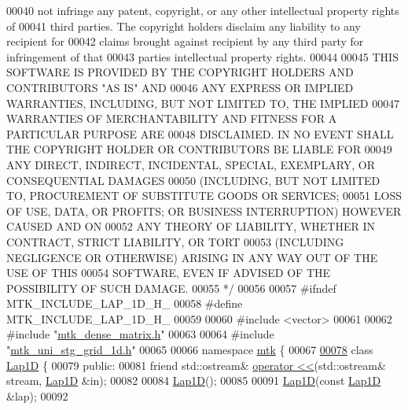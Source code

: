 \begin{DoxyCode}
00040 \textcolor{comment}{not infringe any patent, copyright, or any other intellectual property rights of}
00041 \textcolor{comment}{third parties. The copyright holders disclaim any liability to any recipient for}
00042 \textcolor{comment}{claims brought against recipient by any third party for infringement of that}
00043 \textcolor{comment}{parties intellectual property rights.}
00044 \textcolor{comment}{}
00045 \textcolor{comment}{THIS SOFTWARE IS PROVIDED BY THE COPYRIGHT HOLDERS AND CONTRIBUTORS "AS IS" AND}
00046 \textcolor{comment}{ANY EXPRESS OR IMPLIED WARRANTIES, INCLUDING, BUT NOT LIMITED TO, THE IMPLIED}
00047 \textcolor{comment}{WARRANTIES OF MERCHANTABILITY AND FITNESS FOR A PARTICULAR PURPOSE ARE}
00048 \textcolor{comment}{DISCLAIMED. IN NO EVENT SHALL THE COPYRIGHT HOLDER OR CONTRIBUTORS BE LIABLE FOR}
00049 \textcolor{comment}{ANY DIRECT, INDIRECT, INCIDENTAL, SPECIAL, EXEMPLARY, OR CONSEQUENTIAL DAMAGES}
00050 \textcolor{comment}{(INCLUDING, BUT NOT LIMITED TO, PROCUREMENT OF SUBSTITUTE GOODS OR SERVICES;}
00051 \textcolor{comment}{LOSS OF USE, DATA, OR PROFITS; OR BUSINESS INTERRUPTION) HOWEVER CAUSED AND ON}
00052 \textcolor{comment}{ANY THEORY OF LIABILITY, WHETHER IN CONTRACT, STRICT LIABILITY, OR TORT}
00053 \textcolor{comment}{(INCLUDING NEGLIGENCE OR OTHERWISE) ARISING IN ANY WAY OUT OF THE USE OF THIS}
00054 \textcolor{comment}{SOFTWARE, EVEN IF ADVISED OF THE POSSIBILITY OF SUCH DAMAGE.}
00055 \textcolor{comment}{*/}
00056 
00057 \textcolor{preprocessor}{#ifndef MTK\_INCLUDE\_LAP\_1D\_H\_}
00058 \textcolor{preprocessor}{#define MTK\_INCLUDE\_LAP\_1D\_H\_}
00059 
00060 \textcolor{preprocessor}{#include <vector>}
00061 
00062 \textcolor{preprocessor}{#include "\hyperlink{mtk__dense__matrix_8h}{mtk\_dense\_matrix.h}"}
00063 
00064 \textcolor{preprocessor}{#include "\hyperlink{mtk__uni__stg__grid__1d_8h}{mtk\_uni\_stg\_grid\_1d.h}"}
00065 
00066 \textcolor{keyword}{namespace }\hyperlink{namespacemtk}{mtk} \{
00067 
\hypertarget{mtk__lap__1d_8h_source_l00078}{}\hyperlink{classmtk_1_1Lap1D}{00078} \textcolor{keyword}{class }\hyperlink{classmtk_1_1Lap1D}{Lap1D} \{
00079  \textcolor{keyword}{public}:
00081   \textcolor{keyword}{friend} std::ostream& \hyperlink{classmtk_1_1Lap1D_a235390479381d4e95163674968a1ca7c}{operator <<}(std::ostream& stream, \hyperlink{classmtk_1_1Lap1D}{Lap1D} &in);
00082 
00084   \hyperlink{classmtk_1_1Lap1D_a6fc2aeea35d4dfa49f17e625411f5a70}{Lap1D}();
00085 
00091   \hyperlink{classmtk_1_1Lap1D_a6fc2aeea35d4dfa49f17e625411f5a70}{Lap1D}(\textcolor{keyword}{const} \hyperlink{classmtk_1_1Lap1D}{Lap1D} &lap);
00092 

\end{DoxyCode}
